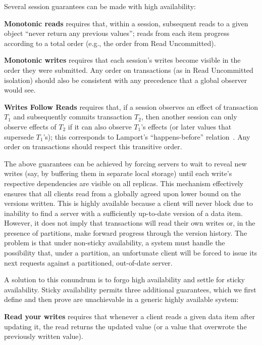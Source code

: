 Several session guarantees can be made with high availability:

\vspace{.5em}\noindent\textbf{{Monotonic reads}} requires that, within
a session, subsequent reads to a given object ``never return any
previous values''; reads from each item progress according to a total
order (e.g., the order from Read Uncommitted).

\vspace{.5em}\noindent\textbf{{Monotonic writes}} requires that each
session's writes become visible in the order they were submitted. Any
order on transactions (as in Read Uncommitted isolation) should also
be consistent with any precedence that a global observer would see.

\vspace{.5em}\noindent\textbf{{Writes Follow Reads}} requires that, if
a session observes an effect of transaction $T_1$ and subsequently
commits transaction $T_2$, then another session can only observe
effects of $T_2$ if it can also observe $T_1$'s effects (or later
values that supersede $T_1$'s); this corresponds to Lamport's
``happens-before'' relation~\cite{lamportclocks}.  Any order on
transactions should respect this transitive order.\vspace{.5em}

The above guarantees can be achieved by forcing servers to wait to
reveal new writes (say, by buffering them in separate local storage)
until each write's respective dependencies are visible on all
replicas. This mechanism effectively ensures that all clients read
from a globally agreed upon lower bound on the versions written. This
is highly available because a client will never block due to inability
to find a server with a sufficiently up-to-date version of a data
item. However, it does not imply that transactions will read their own
writes or, in the presence of partitions, make forward progress
through the version history. The problem is that under non-sticky
availability, a system must handle the possibility that, under a
partition, an unfortunate client will be forced to issue its next
requests against a partitioned, out-of-date server.

A solution to this conundrum is to forgo high availability and settle
for sticky availability. Sticky availability permits three additional
guarantees, which we first define and then prove are unachievable in a
generic highly available system:

\vspace{.5em}\noindent\textbf{{Read your writes}} requires that
whenever a client reads a given data item after updating it, the read
returns the updated value (or a value that overwrote the previously
written value).

